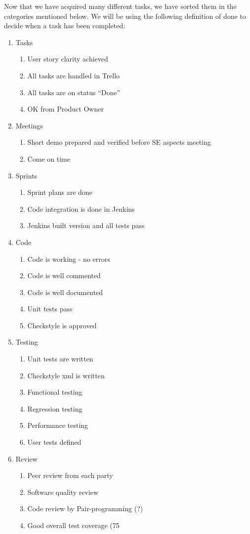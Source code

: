 Now that we have acquired many different tasks, we have sorted them in the categories mentioned below. We will be using the following definition of done to decide when a task has been completed:

\begin{enumerate}
\item Tasks
\begin{enumerate}
	 \item User story clarity achieved
	   \item All tasks are handled in Trello
	   \item All tasks are on status “Done”
	   \item OK from Product Owner
	\end{enumerate}

\item Meetings
\begin{enumerate}
   \item Short demo prepared and verified before SE aspects meeting
   \item Come on time
\end{enumerate}


\item Sprints
\begin{enumerate}
   \item Sprint plans are done
   \item Code integration is done in Jenkins
   \item Jenkins built version and all tests pass
\end{enumerate}

\item Code
\begin{enumerate}
   \item Code is working - no errors 
   \item Code is well commented
   \item Code is well documented
   \item Unit tests pass
   \item Checkstyle is approved
\end{enumerate}

\item Testing
\begin{enumerate}
   \item Unit tests are written
   \item Checkstyle xml is written
   \item Functional testing
   \item Regression testing
   \item Performance testing
   \item User tests defined
\end{enumerate}

\item Review
\begin{enumerate}
   \item Peer review from each party
   \item Software quality review
   \item Code review by Pair-programming (?)
   \item Good overall test coverage (75%
\end{enumerate}	
\end{enumerate}
